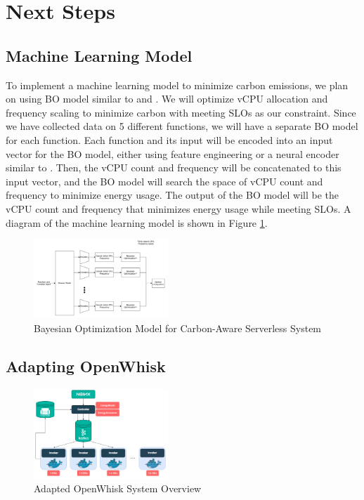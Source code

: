 \documentclass[times, 10pt,twocolumn]{article}
\begin{document}


\section{Next Steps}

\subsection{Machine Learning Model}
To implement a machine learning model to minimize carbon emissions, we plan on using BO model similar to \cite{CherryPick} and \cite{AQUATOPE}. We will optimize vCPU allocation and frequency scaling to minimize carbon with meeting SLOs as our constraint. Since we have collected data on 5 different functions, we will have a separate BO model for each function. Each function and its input will be encoded into an input vector for the BO model, either using feature engineering or a neural encoder similar to \cite{AQUATOPE}. Then, the vCPU count and frequency will be concatenated to this input vector, and the BO model will search the space of vCPU count and frequency to minimize energy usage. The output of the BO model will be the vCPU count and frequency that minimizes energy usage while meeting SLOs. A diagram of the machine learning model is shown in Figure \ref{fig:ml_model}.

\begin{figure}[ht]
   \centering
   \includegraphics[width=0.45\textwidth]{imgs/ml_model.png}
   \caption{Bayesian Optimization Model for Carbon-Aware Serverless System}
   \label{fig:ml_model}
 \end{figure}
\subsection{Adapting OpenWhisk}

\begin{figure}[ht]
   \centering
   \includegraphics[width=0.45\textwidth]{imgs/Adapted_OW_System_Overview.png}
   \caption{Adapted OpenWhisk System Overview}
   \label{fig:adapted_ow_system_overview}
 \end{figure}
\end{document}
